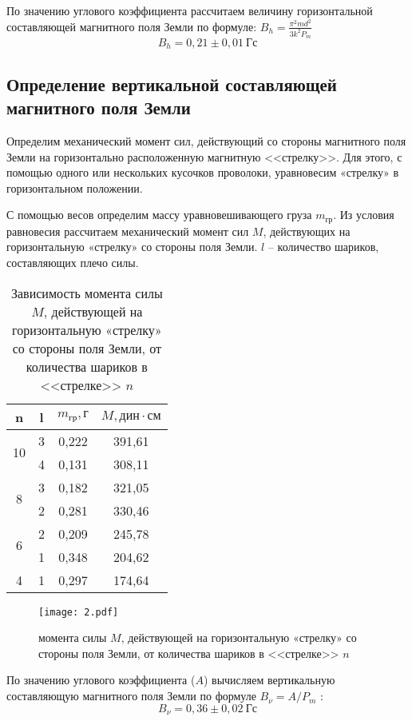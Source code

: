 По значению углового коэффициента рассчитаем величину горизонтальной составляющей магнитного поля
Земли по формуле: $B_h = \frac{\pi^2 m d^2}{3 k^2 P_m}$ 
\[B_h = 0,21 \pm 0,01\ \text{Гс}\]

\subsection*{Определение вертикальной составляющей магнитного поля Земли}
Определим механический момент сил, действующий со стороны магнитного поля Земли на горизонтально
расположенную магнитную <<стрелку>>. Для этого, с помощью одного или нескольких кусочков проволоки,
уравновесим «стрелку» в горизонтальном положении.

С помощью весов определим массу
уравновешивающего груза $m_{\text{гр}}$. Из условия равновесия рассчитаем механический момент сил
$M$, действующих на горизонтальную «стрелку» со стороны поля Земли. $l$ -- количество шариков,
составляющих плечо силы.
\begin{table}[H]
\centering
\begin{tabular}{|c|c|c|c|}
\hline
n  & l & $m_\text{гр}, \text{г}$     & $M, \text{дин} \cdot \text{см}$   \\ \hline
\multirow{2}{*}{10} & 3 & 0,222 & 391,61 \\ \cline{2-4} 
                    & 4 & 0,131 & 308,11 \\ \hline
\multirow{2}{*}{8}  & 3 & 0,182 & 321,05 \\ \cline{2-4} 
                    & 2 & 0,281 & 330,46 \\ \hline
\multirow{2}{*}{6}  & 2 & 0,209 & 245,78 \\ \cline{2-4} 
                    & 1 & 0,348 & 204,62 \\ \hline
4                   & 1 & 0,297 & 174,64 \\ \hline
\end{tabular}
\captionsetup{justification=centering}
\caption{Зависимость момента силы $M$, действующей на горизонтальную «стрелку» со стороны поля
Земли, от количества шариков в <<стрелке>> $n$}
\end{table}
\begin{figure}[H]
    \centering
    \texttt{[image: 2.pdf]}
    \captionsetup{justification=centering}
    \caption{момента силы $M$, действующей на горизонтальную «стрелку» со стороны поля
Земли, от количества шариков в <<стрелке>> $n$}
\end{figure}
По значению углового коэффициента ($A$) вычисляем вертикальную составляющую магнитного поля Земли
по формуле $B_\nu = A/P_m$ :
\[ B_\nu  = 0,36 \pm 0,02\ \text{Гс}\]

